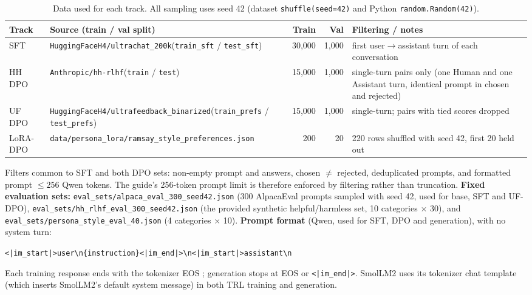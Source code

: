 \documentclass[10pt]{article}
\newcommand{\code}[1]{\texttt{\small #1}}
\begin{document}
\begin{table}[h]
\centering\footnotesize
\caption{Data used for each track. All sampling uses seed 42 (dataset \code{shuffle(seed=42)} and Python \code{random.Random(42)}).}
\label{tab:data}
\begin{tabularx}{\linewidth}{@{}l >{\raggedright\arraybackslash}p{5.9cm} r r Y@{}}
\toprule
Track & Source (train / val split) & Train & Val & Filtering / notes \\
\midrule
SFT & \texttt{HuggingFaceH4/ultrachat\_200k}\newline (\texttt{train\_sft} / \texttt{test\_sft}) & 30{,}000 & 1{,}000 & first user$\to$assistant turn of each conversation \\
HH DPO & \texttt{Anthropic/hh-rlhf}\newline (\texttt{train} / \texttt{test}) & 15{,}000 & 1{,}000 & single-turn pairs only (one Human and one Assistant turn, identical prompt in chosen and rejected) \\
UF DPO & \texttt{HuggingFaceH4/ultrafeedback\_binarized}\newline (\texttt{train\_prefs} / \texttt{test\_prefs}) & 15{,}000 & 1{,}000 & single-turn; pairs with tied scores dropped \\
LoRA-DPO & \texttt{data/persona\_lora/}\newline\texttt{ramsay\_style\_preferences.json} & 200 & 20 & 220 rows shuffled with seed 42, first 20 held out \\
\bottomrule
\end{tabularx}
\end{table}
\vspace{-0.5em}
Filters common to SFT and both DPO sets: non-empty prompt and answers, chosen $\neq$ rejected, deduplicated prompts, and formatted prompt $\le 256$ Qwen tokens. The guide's 256-token prompt limit is therefore enforced by filtering rather than truncation.
\textbf{Fixed evaluation sets:} \code{eval\_sets/alpaca\_eval\_300\_seed42.json} (300 AlpacaEval prompts sampled with seed 42, used for base, SFT and UF-DPO), \code{eval\_sets/hh\_rlhf\_eval\_300\_seed42.json} (the provided synthetic helpful/harmless set, 10 categories $\times$ 30), and \code{eval\_sets/persona\_style\_eval\_40.json} (4 categories $\times$ 10).
\textbf{Prompt format} (Qwen, used for SFT, DPO and generation), with no system turn:\\[1pt]
\centerline{\code{<|im\_start|>user\textbackslash n\{instruction\}<|im\_end|>\textbackslash n<|im\_start|>assistant\textbackslash n}}
 Each training response ends with the tokenizer EOS \code{<|endoftext|>}; generation stops at EOS or \code{<|im\_end|>}. SmolLM2 uses its tokenizer chat template (which inserts SmolLM2's default system message) in both TRL training and generation.
\end{document}
